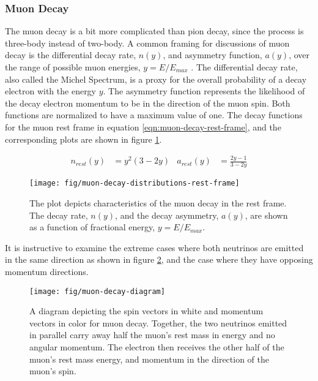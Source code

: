 \subsubsection{Muon Decay}

The muon decay is a bit more complicated than pion decay, since the process is three-body instead of two-body.  A common framing for discussions of muon decay is the differential decay rate, $n(y)$, and asymmetry function, $a(y)$, over the range of possible muon energies, $y=E/E_{max}$ \cite{e989-tdr}.  The differential decay rate, also called the Michel Spectrum, is a proxy for the overall probability of a decay electron with the energy $y$.  The asymmetry function represents the likelihood of the decay electron momentum to be in the direction of the muon spin.  Both functions are normalized to have a maximum value of one.  The decay functions for the muon rest frame in equation \ref{eqn:muon-decay-rest-frame}, and the corresponding plots are shown in figure \ref{fig:muon-decay-rest-frame}.

\begin{align}
\label{eqn:muon-decay-rest-frame}
n_{rest}(y) & = y^2(3 - 2 y) & a_{rest}(y) & = \frac{2 y - 1}{3 - 2y}
\end{align}

\begin{figure}
\centering
\texttt{[image: fig/muon-decay-distributions-rest-frame]}
\caption{
    The plot depicts characteristics of the muon decay in the rest frame.  The decay rate, $n(y)$, and the decay asymmetry, $a(y)$, are shown as a function of fractional energy, $y=E/E_{max}$.
    \label{fig:muon-decay-rest-frame}
}
\end{figure}

It is instructive to examine the extreme cases where both neutrinos are emitted in the same direction as shown in figure \ref{fig:muon-decay-diagram}, and the case where they have opposing momentum directions. 

\begin{figure}
\centering
\texttt{[image: fig/muon-decay-diagram]}
\caption{
    A diagram depicting the spin vectors in white and momentum vectors in color for muon decay. Together, the two neutrinos emitted in parallel carry away half the muon's rest mass in energy and no angular momentum.  The electron then receives the other half of the muon's rest mass energy, and momentum in the direction of the muon's spin. 
    \label{fig:muon-decay-diagram}
}
\end{figure}

